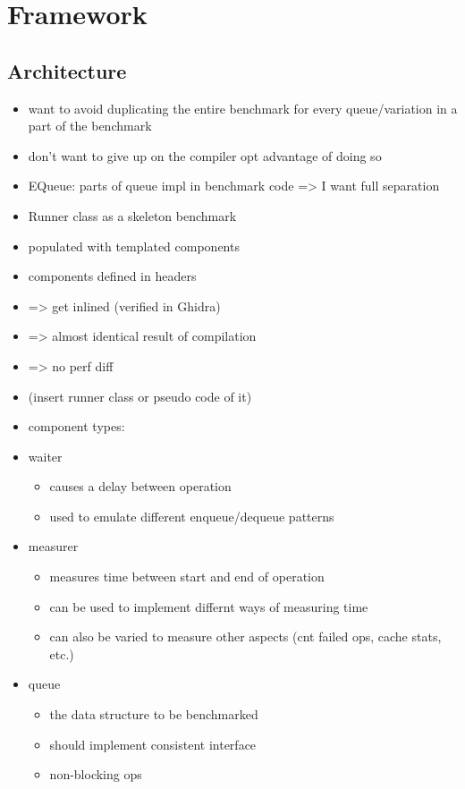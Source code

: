 \section{Framework}
\subsection{Architecture}
\begin{itemize}
    \item want to avoid duplicating the entire benchmark for every queue/variation in a part of the benchmark
    \item don't want to give up on the compiler opt advantage of doing so
    \item EQueue: parts of queue impl in benchmark code => I want full separation

    \item Runner class as a skeleton benchmark
    \item populated with templated components
    \item components defined in headers
    \item => get inlined (verified in Ghidra)
    \item => almost identical result of compilation
    \item => no perf diff
    \item (insert runner class or pseudo code of it)
    \item component types:
    \item waiter
        \begin{itemize}
            \item causes a delay between operation
            \item used to emulate different enqueue/dequeue patterns
        \end{itemize}
    \item measurer
        \begin{itemize}
            \item measures time between start and end of operation
            \item can be used to implement differnt ways of measuring time
            \item can also be varied to measure other aspects (cnt failed ops, cache stats, etc.)
        \end{itemize}
    \item queue
        \begin{itemize}
            \item the data structure to be benchmarked
            \item should implement consistent interface
            \item non-blocking ops
        \end{itemize}
\end{itemize}

